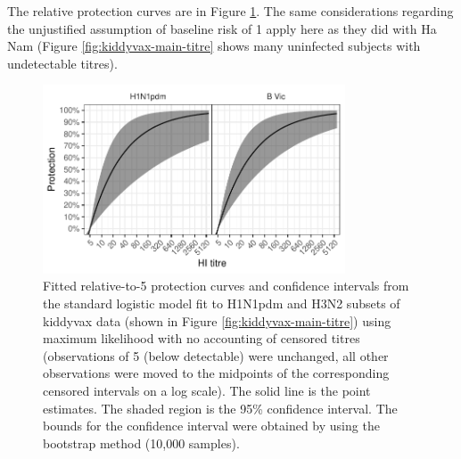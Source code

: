 The relative protection curves are in Figure \ref{fig:kiddyvaxmain-prot-rel-lr-boot}. The same considerations regarding the unjustified assumption of baseline risk of 1 apply here as they did with Ha Nam (Figure \ref{fig:kiddyvax-main-titre} shows many uninfected subjects with undetectable titres).

\begin{figure}[htp]
	\centering
	\includegraphics[width=0.8\textwidth]{../fit-logistic-boot-plot/kiddyvaxmain-prot-rel.pdf}
	\caption{
	Fitted relative-to-5 protection curves and confidence intervals from the standard logistic model fit to H1N1pdm and H3N2 subsets of kiddyvax data (shown in Figure \ref{fig:kiddyvax-main-titre}) using maximum likelihood with no accounting of censored titres (observations of 5 (below detectable) were unchanged, all other observations were moved to the midpoints of the corresponding censored intervals on a log scale). The solid line is the point estimates. The shaded region is the 95\% confidence interval. The bounds for the confidence interval were obtained by using the bootstrap method (10,000 samples).
	}
	\label{fig:kiddyvaxmain-prot-rel-lr-boot}
\end{figure}
